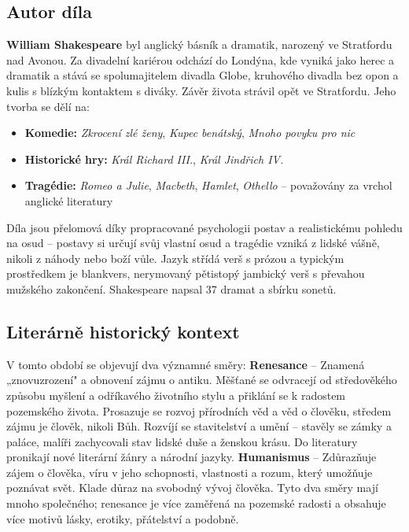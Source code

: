 \documentclass[12pt, a4paper]{article}
\begin{document}
\subsection*{Autor díla}
\textbf{William Shakespeare} byl anglický básník a dramatik, narozený ve Stratfordu nad Avonou. Za divadelní kariérou odchází do Londýna, kde vyniká jako herec a dramatik a stává se spolumajitelem divadla Globe, kruhového divadla bez opon a kulis s blízkým kontaktem s diváky. Závěr života strávil opět ve Stratfordu. Jeho tvorba se dělí na:
\begin{itemize}[itemsep=0.3em]
	\item \textbf{Komedie:} \textit{Zkrocení zlé ženy}, \textit{Kupec benátský}, \textit{Mnoho povyku pro nic}
	\item \textbf{Historické hry:} \textit{Král Richard III.}, \textit{Král Jindřich IV.}
	\item \textbf{Tragédie:} \textit{Romeo a Julie}, \textit{Macbeth}, \textit{Hamlet}, \textit{Othello} -- považovány za vrchol anglické literatury
\end{itemize}
Díla jsou přelomová díky propracované psychologii postav a realistickému pohledu na osud -- postavy si určují svůj vlastní osud a tragédie vzniká z lidské vášně, nikoli z náhody nebo boží vůle. Jazyk střídá verš s prózou a typickým prostředkem je blankvers, nerymovaný pětistopý jambický verš s převahou mužského zakončení. Shakespeare napsal 37 dramat a sbírku sonetů.

\subsection*{Literárně historický kontext}
V tomto období se objevují dva významné směry:
\noindent\textbf{Renesance} -- Znamená „znovuzrození" a obnovení zájmu o antiku. Měšťané se odvracejí od středověkého způsobu myšlení a odříkavého životního stylu a přiklání se k radostem pozemského života. Prosazuje se rozvoj přírodních věd a věd o člověku, středem zájmu je člověk, nikoli Bůh. Rozvíjí se stavitelství a umění -- stavěly se zámky a paláce, malíři zachycovali stav lidské duše a ženskou krásu. Do literatury pronikají nové literární žánry a národní jazyky.
\noindent\textbf{Humanismus} -- Zdůrazňuje zájem o člověka, víru v jeho schopnosti, vlastnosti a rozum, který umožňuje poznávat svět. Klade důraz na svobodný vývoj člověka.
Tyto dva směry mají mnoho společného; renesance je více zaměřená na pozemské radosti a obsahuje více motivů lásky, erotiky, přátelství a podobně.
{\color{subsectioncolor}\hrulefill}
\end{document}
